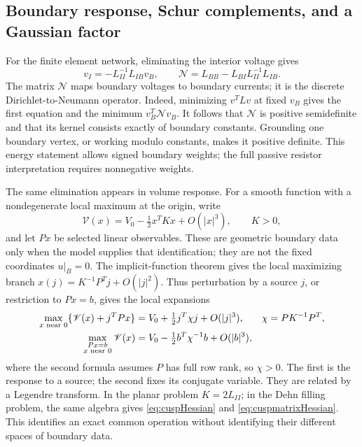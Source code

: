 \subsection{Boundary response, Schur complements, and a Gaussian factor}
\label{subsec:ipolyResponse}

For the finite element network, eliminating the interior voltage gives
\begin{equation}
 v_I=-L_{II}^{-1}L_{IB}v_B,\qquad
 \mathcal N=L_{BB}-L_{BI}L_{II}^{-1}L_{IB}.
 \label{eq:ipolyDtN}
\end{equation}
The matrix $\mathcal N$ maps boundary voltages to boundary currents;
it is the discrete Dirichlet-to-Neumann operator. Indeed, minimizing
$v^TLv$ at fixed $v_B$ gives the first equation and the minimum
$v_B^T\mathcal N v_B$. It follows that $\mathcal N$ is positive
semidefinite and that its kernel consists exactly of boundary constants.
Grounding one boundary vertex, or working modulo constants, makes it
positive definite. This energy statement allows signed boundary weights;
the full passive resistor interpretation requires nonnegative weights.

The same elimination appears in volume response. For a smooth function
with a nondegenerate local maximum at the origin, write
\[
 \mathscr V(x)=V_0-\tfrac12x^TKx+O(|x|^3),\qquad K>0,
\]
and let $Px$ be selected linear observables. These are geometric boundary
data only when the model supplies that identification; they are not the
fixed coordinates $u|_B=0$. The implicit-function theorem gives the local
maximizing branch $x(j)=K^{-1}P^Tj+O(|j|^2)$. Thus perturbation by a
source $j$, or restriction to $Px=b$, gives the local expansions
\begin{align}
 \max_{x\text{ near }0}\{\mathscr V(x)+j^TPx\}
    &=V_0+\tfrac12j^T\chi j+O(|j|^3),
 &\chi&=PK^{-1}P^T,\notag\\
 \max_{\substack{Px=b\\x\text{ near }0}}\mathscr V(x)
    &=V_0-\tfrac12b^T\chi^{-1}b+O(|b|^3),
 \label{eq:ipolyBoundaryResponse}
\end{align}
where the second formula assumes $P$ has full row rank, so $\chi>0$.
The first is the response to a source; the second fixes its conjugate
variable. They are related by a Legendre transform. In the planar
problem $K=2L_{II}$; in the Dehn filling problem, the same algebra gives
\eqref{eq:cuspHessian} and \eqref{eq:cuspmatrixHessian}. This identifies
an exact common operation without identifying their different spaces
of boundary data.

